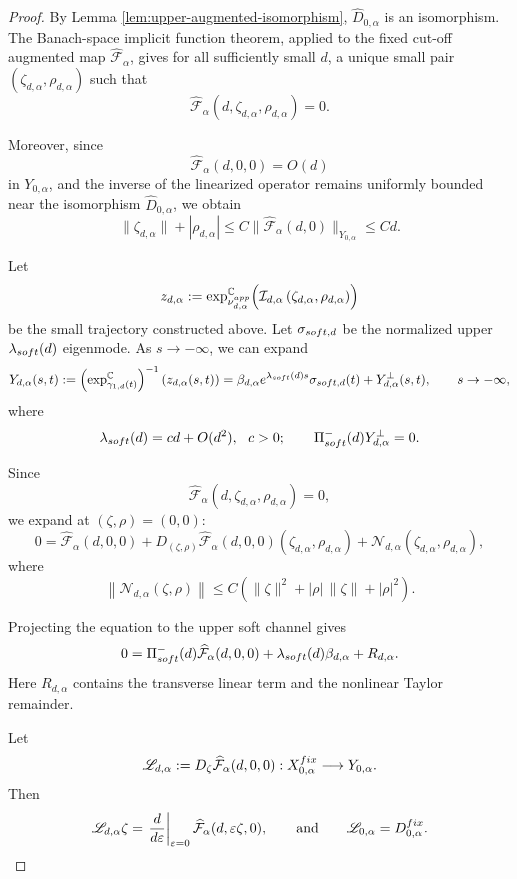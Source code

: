 \documentclass[10pt,a4paper]{amsart}
\newcommand{\C}{\mathbb{C}}
\begin{document}
\begin{proof}
By Lemma \ref{lem:upper-augmented-isomorphism}, $\widehat{D}_{0,\alpha}$ is an
isomorphism. The Banach-space implicit function theorem, applied to the fixed cut-off augmented map $\widehat{\mathcal{F}}_{\alpha}$, gives for all sufficiently small $d$, a unique small pair
$(\zeta_{d,\alpha},\rho_{d,\alpha})$ such that
\[
\widehat{\mathcal F}_\alpha
(d,\zeta_{d,\alpha},\rho_{d,\alpha})=0.
\]

Moreover, since
\[
\widehat{\mathcal F}_\alpha(d,0,0)=O(d)
\]
in $Y_{0,\alpha}$, and the inverse of the linearized operator remains
uniformly bounded near the isomorphism $\widehat D_{0,\alpha}$, we obtain
\begin{equation}\label{eq:zeta-rho}
\|\zeta_{d,\alpha}\|+|\rho_{d,\alpha}|\le C\|\widehat{\mathcal F}_\alpha(d,0)\|_{Y_{0,\alpha}}
\le Cd.
\end{equation}

Let
\[
z_{d,\alpha}:=\exp_{\nu^{\rm app}_{d,\alpha}}^{\C}
\Bigl(\mathcal I_{d,\alpha}\left(\zeta_{d,\alpha},\rho_{d,\alpha}
\right)\Bigr)
\]
be the small trajectory constructed above. Let
$\sigma_{{\rm soft},d}$ be the normalized upper $\lambda_{\rm soft}(d)$ eigenmode.
As $s\to-\infty$, we can expand
\[
Y_{d,\alpha}(s,t):=\left(\exp_{\gamma_{1,d}(t)}^{\C}\right)^{-1}(z_{d,\alpha}(s,t))=\beta_{d,\alpha}
e^{\lambda_{\rm soft}(d)s}
\sigma_{{\rm soft},d}(t)
+Y_{d,\alpha}^{\perp}(s,t),\qquad s\to-\infty,
\]
where
\[
\lambda_{\rm soft}(d)=c d+O(d^2),~~c>0;
\qquad
\Pi_{\rm soft}^-(d)Y_{d,\alpha}^{\perp}=0.
\]


Since
\[
\widehat{\mathcal F}_{\alpha}
\left(d,\zeta_{d,\alpha},\rho_{d,\alpha}\right)=0,
\]
we expand at $(\zeta,\rho)=(0,0)$:
\[
0=\widehat{\mathcal F}_{\alpha}(d,0,0)+D_{(\zeta,\rho)}
\widehat{\mathcal F}_{\alpha}(d,0,0)
\left(\zeta_{d,\alpha},\rho_{d,\alpha}
\right)+\mathcal N_{d,\alpha}
\left(\zeta_{d,\alpha},\rho_{d,\alpha}\right),
\]
where
\[
\left\|\mathcal N_{d,\alpha}(\zeta,\rho)\right\|
\le C\left(\|\zeta\|^2+|\rho|\,\|\zeta\|+|\rho|^2
\right).
\]

Projecting the equation to the upper soft channel gives
\[
0=\Pi_{\rm soft}^-(d)\widehat{\mathcal F}_{\alpha}(d,0,0)+\lambda_{\rm soft}(d)\beta_{d,\alpha}+
R_{d,\alpha}.
\]
Here $R_{d,\alpha}$ contains the transverse linear term and the nonlinear Taylor remainder.  


Let
\[
\mathscr L_{d,\alpha}
:=D_\zeta\widehat{\mathcal F}_\alpha(d,0,0)
:X^{\rm fix}_{0,\alpha}\longrightarrow Y_{0,\alpha}.
\]
Then
\[
\mathscr L_{d,\alpha}\zeta
=\left.\frac{d}{d\varepsilon}\right|_{\varepsilon=0}
\widehat{\mathcal F}_\alpha(d,\varepsilon\zeta,0),\qquad\text{and}\qquad \mathscr L_{0,\alpha}=D_{0,\alpha}^{\rm fix}.
\]


\end{proof}
\end{document}
